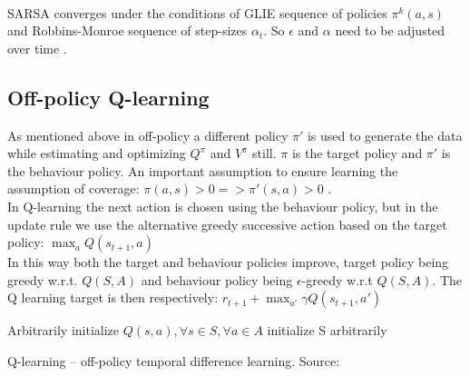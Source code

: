 \\SARSA converges under the conditions of GLIE sequence of policies $\pi^k(a, s)$ and Robbins-Monroe sequence of step-sizes $\alpha_t$. So $\epsilon$ and $\alpha$ need to be adjusted over time \cite{lecture_mfc}.


\subsection{Off-policy Q-learning}

As mentioned above in off-policy a different policy  $\pi'$ is used to generate the data while estimating and optimizing $Q^{\pi}$ and $V^{\pi}$ still. $\pi$ is the target policy and $\pi'$ is the  behaviour policy. An important assumption to ensure learning the assumption of coverage: $\pi(a, s) > 0 => \pi'(s, a) > 0$ \cite{lecture_mfc}.\\


In Q-learning the  next action is chosen using the behaviour policy, but in the update rule we use the alternative greedy successive action based on the target policy: $\max_a Q(s_{t+1}, a)$\\

In this way both the target and behaviour policies improve, target policy being greedy w.r.t. $Q(S, A)$ and behaviour policy being $\epsilon$-greedy w.r.t $Q(S, A)$. The Q learning target is then respectively: $r_{t+1} + \max_{a'} \gamma Q(s_{t+1}, a')$\\


\begin{algorithm}[H]
\SetAlgoLined
Arbitrarily initialize $Q(s, a), \forall s \in S, \forall a \in A$\;
initialize S arbitrarily\;
\caption{Q-learning -- off-policy temporal difference learning. Source: \cite{lecture_mfc} }
\end{algorithm}\\


